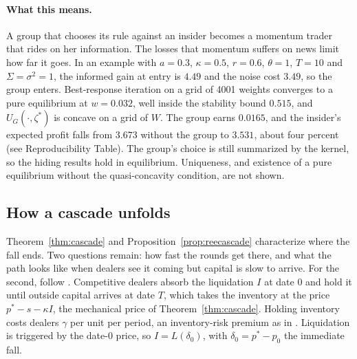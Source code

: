 \documentclass[12pt]{article}
\theoremstyle{definition}
\theoremstyle{remark}
\begin{document}
\paragraph{What this means.} A group that chooses its rule against an insider becomes a momentum trader that rides on her information. The losses that momentum suffers on news limit how far it goes. In an example with $a=0.3$, $\kappa=0.5$, $r=0.6$, $\theta=1$, $T=10$ and $\Sigma=\sigma^2=1$, the informed gain at entry is $4.49$ and the noise cost $3.49$, so the group enters. Best-response iteration on a grid of 4001 weights converges to a pure equilibrium at $w=0.032$, well inside the stability bound $0.515$, and $U_G(\cdot,\zeta^*)$ is concave on a grid of $W$. The group earns $0.0165$, and the insider's expected profit falls from $3.673$ without the group to $3.531$, about four percent (see Reproducibility Table). The group's choice is still summarized by the kernel, so the hiding results hold in equilibrium. Uniqueness, and existence of a pure equilibrium without the quasi-concavity condition, are not shown.

\subsection{How a cascade unfolds}

Theorem~\ref{thm:cascade} and Proposition~\ref{prop:reecascade} characterize where the fall ends. Two questions remain: how fast the rounds get there, and what the path looks like when dealers see it coming but capital is slow to arrive. For the second, follow \citet{duffie2010}. Competitive dealers absorb the liquidation $I$ at date $0$ and hold it until outside capital arrives at date $T$, which takes the inventory at the price $p^*-s-\kappa I$, the mechanical price of Theorem~\ref{thm:cascade}. Holding inventory costs dealers $\gamma$ per unit per period, an inventory-risk premium as in \citet{grossman1988}. Liquidation is triggered by the date-$0$ price, so $I=L(\delta_0)$, with $\delta_0=p^*-p_0$ the immediate fall.
\end{document}
